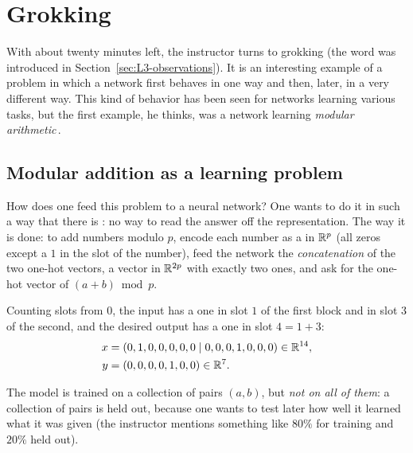 
\section{Grokking}\label{sec:L5-grok}
With about twenty minutes left, the instructor turns to grokking (the word was introduced in Section~\ref{sec:L3-observations}). It is an interesting example of a problem in which a network first behaves in one way and then, later, in a very different way. This kind of behavior has been seen for networks learning various tasks, but the first example, he thinks, was a network learning \emph{modular arithmetic}\,\citep{power2022}.

\subsection{Modular addition as a learning problem}\label{sec:L5-modular}
How does one feed this problem to a neural network? One wants to do it in such a way that there is : no way to read the answer off the representation. The way it is done: to add numbers modulo $p$, encode each number as a  in $\mathbb{R}^p$ (all zeros except a $1$ in the slot of the number), feed the network the \emph{concatenation} of the two one-hot vectors, a vector in $\mathbb{R}^{2p}$ with exactly two ones, and ask for the one-hot vector of $(a+b)\bmod p$.

\begin{exmp}[$p=7$, the pair $(1,3)$]
Counting slots from $0$, the input has a one in slot $1$ of the first block and in slot $3$ of the second, and the desired output has a one in slot $4=1+3$:
\begin{align*}
  x&=(0,1,0,0,0,0,0\;|\;0,0,0,1,0,0,0)\in\mathbb{R}^{14},\\
  y&=(0,0,0,0,1,0,0)\in\mathbb{R}^{7}.
\end{align*}
\end{exmp}

The model is trained on a collection of pairs $(a,b)$, but \emph{not on all of them}: a collection of pairs is held out, because one wants to test later how well it learned what it was given (the instructor mentions something like $80\%$ for training and $20\%$ held out).

